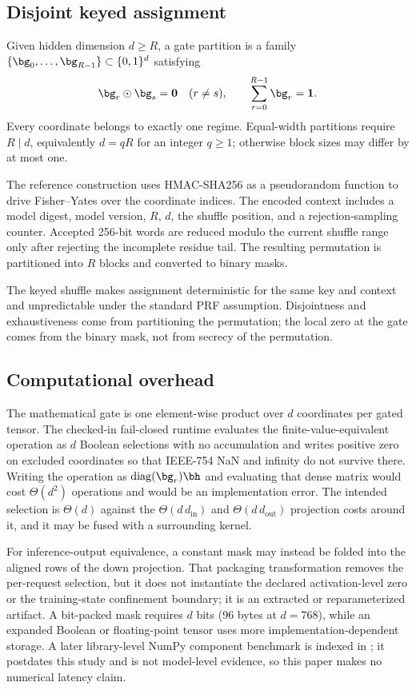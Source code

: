 \documentclass[11pt]{article}
\begin{document}
\subsection{Disjoint keyed assignment}

Given hidden dimension $d\ge R$, a gate partition is a family
$\{\bg_0,\ldots,\bg_{R-1}\}\subset\{0,1\}^d$ satisfying
\begin{equation}
  \bg_r\odot\bg_s=\mathbf 0\quad(r\ne s),
  \qquad \sum_{r=0}^{R-1}\bg_r=\mathbf 1.
  \label{eq:partition}
\end{equation}
Every coordinate belongs to exactly one regime. Equal-width partitions require
$R\mid d$, equivalently $d=qR$ for an integer $q\ge1$; otherwise block sizes
may differ by at most one.

The reference construction uses HMAC-SHA256 as a pseudorandom function to drive
Fisher--Yates over the coordinate indices. The encoded context includes a model
digest, model version, $R$, $d$, the shuffle position, and a rejection-sampling
counter. Accepted 256-bit words are reduced modulo the current shuffle range
only after rejecting the incomplete residue tail. The resulting permutation is
partitioned into $R$ blocks and converted to binary masks.

The keyed shuffle makes assignment deterministic for the same key and context
and unpredictable under the standard PRF assumption. Disjointness and
exhaustiveness come from partitioning the permutation; the local zero at the
gate comes from the binary mask, not from secrecy of the permutation.

\subsection{Computational overhead}

The mathematical gate is one element-wise product over $d$ coordinates per
gated tensor. The checked-in fail-closed runtime evaluates the
finite-value-equivalent operation as $d$ Boolean selections with no
accumulation and writes positive zero on excluded coordinates so that IEEE-754
NaN and infinity do not survive there. Writing the operation as
$\operatorname{diag}(\bg_r)\bh$ and evaluating that dense matrix would cost
$\Theta(d^2)$ operations and would be an implementation error. The intended
selection is $\Theta(d)$ against the
$\Theta(d\,d_{\mathrm{in}})$ and $\Theta(d\,d_{\mathrm{out}})$ projection
costs around it, and it may be fused with a surrounding kernel.

For inference-output equivalence, a constant mask may instead be folded into
the aligned rows of the down projection. That packaging transformation removes
the per-request selection, but it does not instantiate the declared
activation-level zero or the training-state confinement boundary; it is an
extracted or reparameterized artifact. A bit-packed mask requires $d$ bits
(96 bytes at $d=768$), while an expanded Boolean or floating-point tensor uses
more implementation-dependent storage. A later library-level NumPy component
benchmark is indexed in ; it postdates this study and
is not model-level evidence, so this paper makes no numerical latency claim.
\end{document}
